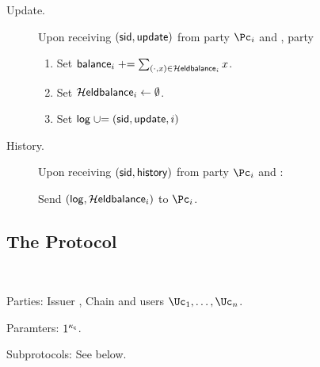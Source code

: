 \begin{functionality}
\begin{description}
\begin{enumerate}
		\end{enumerate}
		
		\item[Update.]     Upon receiving $(\mathsf{sid},\mathsf{update})$ from  party $\Pc_i$ and \Cc,  party \Cc
		
		\begin{enumerate}
			
			
			\item Set $\mathsf{balance}_i  \mathrel{+}= \sum_{(\cdot,x) \in \mathcal{H}\mathsf{eldbalance}_i} x$.
			
			\item Set $\mathcal{H}\mathsf{eldbalance}_i  \leftarrow \emptyset$.
			
			\item Set $\mathsf{log} \mathrel{\cup}= (\mathsf{sid},\mathsf{update},i)$
			
			
		\end{enumerate}

		
		
		\item[History.]     Upon receiving $(\mathsf{sid},\mathsf{history})$ from  party $\Pc_i$ and \Cc:  
		
		Send $(\mathsf{log},\mathcal{H}\mathsf{eldbalance}_i)$ to  $\Pc_i$.	 
		
	\end{description}

\end{functionality}

\subsection{The Protocol}\label{sec:MainProtocol:Protocol}


\begin{protocol}~\label{prot:ConfidentialTransactions}

\item[Parties:] Issuer \Ic, Chain \Cc and users  $\Uc_1, \ldots,\Uc_n$.

\item[Paramters:]	$1^{\kappa_{\mathsf c}}$.

\item[Subprotocols:]  See below.
\end{protocol}


